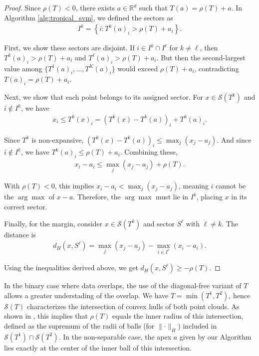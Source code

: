 \documentclass{article}
\renewcommand{\geq}{\geqslant}
\renewcommand{\leq}{\leqslant}
\newcommand{\R}{\mathbb{R}}
\begin{document}
\begin{proof}
Since $\rho(T) < 0$, there exists $a \in \R^d$ such that $T(a) = \rho(T) + a$. In Algorithm \ref{alg:tropical_svm}, we defined the sectors as
\begin{align}
I^k = \left\{i : T^k(a)_i > \rho(T) + a_i\right\}.
\end{align}

First, we show these sectors are disjoint. If $i \in I^k \cap I^{\ell}$ for $k \neq \ell$, then $T^k(a)_i > \rho(T) + a_i$ and $T^{\ell}(a)_i > \rho(T) + a_i$. But then the second-largest value among $\{T^1(a)_i,\ldots,T^K(a)_i\}$ would exceed $\rho(T) + a_i$, contradicting $T(a)_i = \rho(T) + a_i$.

Next, we show that each point belongs to its assigned sector. For $x \in \mathcal{S}(T^k)$ and $i \not\in I^k$, we have
\begin{align}
x_i \leq T^k(x)_i = (T^k(x) - T^k(a))_i + T^k(a)_i.
\end{align}

Since $T^k$ is non-expansive, $(T^k(x) - T^k(a))_i \leq \max_j(x_j - a_j)$. And since $i \not\in I^k$, we have $T^k(a)_i \leq \rho(T) + a_i$. Combining these,
\begin{align}
x_i - a_i \leq \max_j(x_j - a_j) + \rho(T).
\end{align}

With $\rho(T) < 0$, this implies $x_i - a_i < \max_j(x_j - a_j)$, meaning $i$ cannot be the $\arg\max$ of $x - a$. Therefore, the $\arg\max$ must lie in $I^k$, placing $x$ in its correct sector.

Finally, for the margin, consider $x \in \mathcal{S}(T^k)$ and sector $S^{\ell}$ with $\ell \neq k$. The distance is 
\begin{align}
d_H(x, S^{\ell}) = \max_j(x_j - a_j) - \max_{i \in I^{\ell}}(x_i - a_i).
\end{align}

Using the inequalities derived above, we get $d_H(x, S^{\ell}) \geq -\rho(T)$.
\end{proof}

In the binary case where data overlaps, the use of the diagonal-free variant of $T$ allows a greater understading of the overlap. We have $T = \min(T^1, T^2)$, hence $\mathcal{S}(T)$ characterizes the intersection of convex hulls of both point clouds. As shown in \cite{akian2020} , this implies that $\rho(T)$ equals the inner radius of this intersection, defined as the supremum of the radii of balls (for $\lVert\cdot\rVert_H$) included in $\mathcal{S}(T^1) \cap \mathcal{S}(T^2)$. In the non-separable case, the apex  $a$ given by our Algorithm lies exactly at the center of the inner ball of this intersection.
\end{document}
